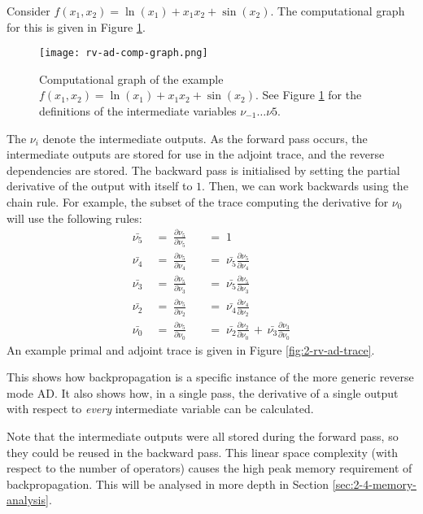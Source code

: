 Consider \(f(x_1, x_2) = \ln(x_1) + x_1x_2 + \sin(x_2)\).
The computational graph for this is given in Figure \ref{fig:2-rv-ad-comp-graph}.
\begin{figure}[h]
    \centering
    \texttt{[image: rv-ad-comp-graph.png]}
    \caption{Computational graph of the example \(f(x_1, x_2) = \ln(x_1) + x_1x_2 + \sin(x_2)\). See Figure \ref{fig:2-rv-ad-comp-graph} for the definitions of the intermediate variables \(\nu_{-1}\ldots\nu{5}\). \cite[Figure~3]{Baydin2015}}
    \label{fig:2-rv-ad-comp-graph}
\end{figure}
The \(\nu_i\) denote the intermediate outputs.
As the forward pass occurs, the intermediate outputs are stored for use in the adjoint trace, and the reverse dependencies are stored.
The backward pass is initialised by setting the partial derivative of the output with itself to \(1\).
Then, we can work backwards using the chain rule.
For example, the subset of the trace computing the derivative for \(\nu_0\) will use the following rules:
\begin{align*}
    \bar{\nu_5} \;&=\; \frac{\partial \nu_5}{\partial \nu_5} \;&&=\; 1 \\[0.5em]
    \bar{\nu_4} \;&=\; \frac{\partial \nu_5}{\partial \nu_4} \;&&=\; \bar{\nu_5}\frac{\partial \nu_5}{\partial \nu_4} \\[0.5em]
    \bar{\nu_3} \;&=\; \frac{\partial \nu_5}{\partial \nu_3} \;&&=\; \bar{\nu_5}\frac{\partial \nu_5}{\partial \nu_3} \\[0.5em]
    \bar{\nu_2} \;&=\; \frac{\partial \nu_5}{\partial \nu_2} \;&&=\; \bar{\nu_4}\frac{\partial \nu_4}{\partial \nu_2} \\[0.5em]
    \bar{\nu_0} \;&=\; \frac{\partial \nu_5}{\partial \nu_0} \;&&=\; \bar{\nu_2}\frac{\partial \nu_2}{\partial \nu_0} \,+\, \bar{\nu_3}\frac{\partial \nu_3}{\partial \nu_0}
\end{align*}
An example primal and adjoint trace is given in Figure \ref{fig:2-rv-ad-trace}.

This shows how backpropagation is a specific instance of the more generic reverse mode AD.
It also shows how, in a single pass, the derivative of a single output with respect to \textit{every} intermediate variable can be calculated.

Note that the intermediate outputs were all stored during the forward pass, so they could be reused in the backward pass.
This linear space complexity (with respect to the number of operators) causes the high peak memory requirement of backpropagation.
This will be analysed in more depth in Section \ref{sec:2-4-memory-analysis}.
